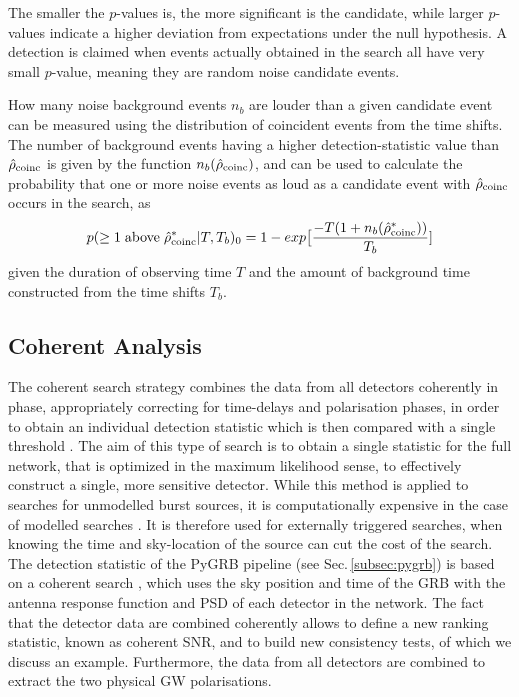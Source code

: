 \documentclass[binding=0.6cm, LaM]{sapthesis}
\begin{document}
	The smaller the $p$-values is, the more significant is the candidate,
	while larger $p$-values indicate a higher deviation from expectations under the null hypothesis.
	A detection is claimed when events actually obtained in the search all have very small $p$-value,
	meaning they are random noise candidate events.

	How many noise background events $n_b$ are louder than a given candidate event
	can be measured using the distribution of coincident events from the time shifts.
	The number of background events having a higher detection-statistic value than $\hat{\rho}_{\rm coinc}$
	is given by the function $n_b(\hat{\rho}_{\rm coinc})$, and can be used to calculate 
	the probability that one or more noise events as loud as a candidate event with $\hat{\rho}_{\rm coinc}$
	occurs in the search, as 
        \begin{equation}
          p(\geq 1 \hspace*{0.1cm}\text{above}\hspace*{0.1cm} \hat{\rho}_{\rm coinc}^*|T,T_b)_0 = 1 - exp\big[ {{-T(1+n_b(\hat{\rho}_{\rm coinc}^*))} \over {T_b}}]
        \end{equation}
	 given the duration of observing time $T$ and the amount of background time 
	constructed from the time shifts $T_b$. \cite{28}

\subsection{Coherent Analysis}
\label{subsec:coherent}
	The coherent search strategy combines the data from all detectors coherently in phase, 
	appropriately correcting for time-delays and polarisation phases, in order
	to obtain an individual detection statistic which is then compared with a single threshold \cite{18}. 
	The aim of this type of search is to obtain a single statistic for the full 
	network, that is optimized in the maximum likelihood sense, 
	to effectively construct a single, more sensitive detector.
 	While this method is applied to searches for unmodelled burst sources,
        it is computationally expensive in the case of modelled searches \cite{45}.
	It is therefore used for externally triggered searches, 
	when knowing the time and sky-location of the source can cut the cost of the search.
	The detection statistic of the {\ttfamily PyGRB} pipeline (see Sec.\,\ref{subsec:pygrb}) 
	is based on a coherent search \cite{46, 92},
	which uses the sky position and time of the GRB with the antenna response function and PSD of each detector in the network. 
        The fact that the detector data are combined coherently allows to define a new ranking statistic, 
	known as coherent SNR, and to build new consistency tests, of which we discuss an example.
	Furthermore, the data from all detectors are combined to extract the two physical GW polarisations. 
\end{document}
